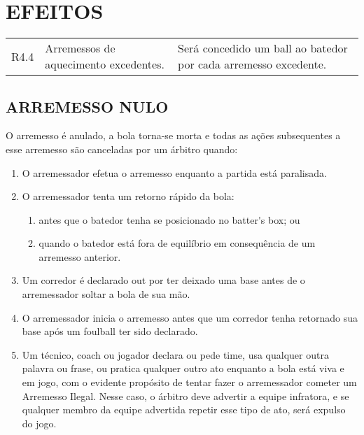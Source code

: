\section*{EFEITOS}

{\footnotesize
	\begin{tabular}{p{}p{}|p{}}
		
		R4.4 & Arremessos de aquecimento excedentes. &
		Ser\'a concedido um \gls{ball} ao batedor por cada arremesso excedente. 
\end{tabular}}


\subsection{ARREMESSO NULO}
	O arremesso \'e anulado, a bola torna-se morta e todas as a\c{c}\~oes subsequentes a esse arremesso s\~ao canceladas por um \'arbitro quando: 
	
	\begin{enumerate}[label=\alph*)]
		\item O arremessador efetua o arremesso enquanto a partida est\'a paralisada. 
		
		\item  O arremessador tenta um retorno r\'apido da bola: 
		
		\begin{enumerate}[label=\roman* -]
			\item  antes que o batedor tenha se posicionado no \gls{batter's box}; ou 
			\item quando o batedor est\'a fora de equil\'ibrio em consequ\^encia de um arremesso 
			anterior. 
		\end{enumerate}
		
		\item  Um corredor \'e declarado \gls{out} por ter deixado uma base antes de o arremessador soltar a bola de sua m\~ao. 
		
		\item  O arremessador inicia o arremesso antes que um corredor tenha retornado sua base ap\'os um \gls{foulball} ter sido declarado. 
		
		\item  Um t\'ecnico, \gls{coach} ou jogador declara ou pede \gls{time}, usa qualquer outra palavra ou frase, ou pratica qualquer outro ato enquanto a bola est\'a viva e em jogo, com o evidente prop\'osito de tentar fazer o arremessador cometer um Arremesso Ilegal. 	Nesse caso, o \'arbitro deve advertir a equipe infratora, e se qualquer membro da equipe advertida repetir esse tipo de ato, ser\'a expulso do jogo. 
	\end{enumerate}

